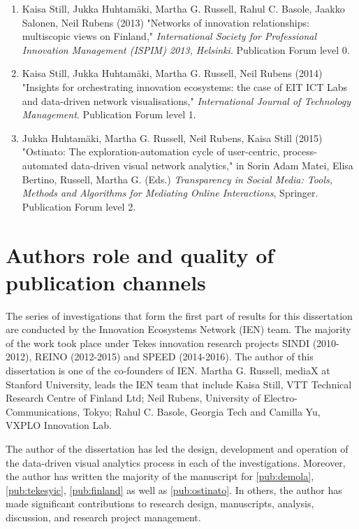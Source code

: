 \begin{midsloppypar}
\begin{enumerate}[label=\textbf{Publication \Roman*},align=left]
  \item Kaisa Still, Jukka Huhtamäki, Martha G. Russell, Rahul C. Basole, Jaakko Salonen, Neil Rubens
  (2013)
  "Networks of innovation relationships: multiscopic views on Finland,"
  \emph{International Society for Professional Innovation Management (ISPIM) 2013, Helsinki}.
  Publication Forum level 0.
  \label{pub:multiscopicfinland}

  \item Kaisa Still, Jukka Huhtamäki, Martha G. Russell, Neil Rubens
  (2014)
  "Insights for orchestrating innovation ecosystems: the case of EIT ICT Labs and data-driven network visualisations,"
  \emph{International Journal of Technology Management}.
  Publication Forum level 1. 
  \label{pub:eitictlabs}
  
  \item Jukka Huhtamäki, Martha G. Russell, Neil Rubens, Kaisa Still 
  (2015) 	
  "Ostinato: The exploration-automation cycle of user-centric, process-automated data-driven visual network analytics," in Sorin Adam Matei,
Elisa Bertino, Russell, Martha G. (Eds.) \emph{Transparency in Social Media: Tools, Methods and Algorithms for Mediating Online Interactions},
  Springer. Publication Forum level 2.
  \label{pub:ostinato}
  
\end{enumerate}

\section{Authors role and quality of publication channels}

The series of investigations that form the first part of results for this dissertation are conducted by the Innovation Ecosystems Network (IEN) team. The majority of the work took place under Tekes innovation research projects SINDI (2010-2012), REINO (2012-2015) and SPEED (2014-2016). The author of this dissertation is one of the co-founders of IEN. Martha G. Russell, mediaX at Stanford University, leads the IEN team that include Kaisa Still, VTT Technical Research Centre of Finland  Ltd; Neil Rubens, University of Electro-Communications, Tokyo; Rahul C. Basole, Georgia Tech and Camilla Yu, VXPLO Innovation Lab.

The author of the dissertation has led the design, development and operation of the data-driven visual analytics process in each of the investigations. Moreover, the author has written the majority of the manuscript for \ref{pub:demola}, \ref{pub:tekesyic}, \ref{pub:finland} as well as \ref{pub:ostinato}. In others, the author has made significant contributions to research design, manuscripts, analysis, discussion, and research project management.


\end{midsloppypar}
